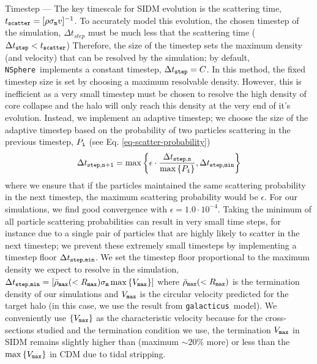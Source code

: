\documentclass[%
 reprint,
 amsmath,
 amssymb,
 aps,
]{revtex4-2}
\def\gal{{\tt galacticus}~}
\def\nsphere{{\tt NSphere}~}
\newcommand{\refeq}[1]{Eq. \ref{#1}}
\begin{document}
Timestep --- 
The key timescale for SIDM evolution is the scattering time, $t_{\tt scatter} = [\rho \sigma_{\tt m} v]^{-1}$.
To accurately model this evolution, the chosen timestep of the simulation, $\Delta t_{step}$ must be much less that the scattering time ($\Delta t_{\tt step}< t_{\tt scatter}$)
Therefore, the size of the timestep sets the maximum density (and velocity) that can be resolved by the simulation; by default, \nsphere implements a constant timestep, $\Delta t_{\tt step} = C$.
In this method, the fixed timestep size is set by choosing a maximum resolvable density. 
However, this is inefficient as a very small timestep must be chosen to resolve the high density of core collapse and the halo will only reach this density at the very end of it's evolution. 
Instead, we implement an adaptive timestep; we choose the size of the adaptive timestep based on the probability of two particles scattering in the previous timestep, $P_{\tt i}$ (see \refeq{eq-scatter-probability})
\begin{equation}
    \Delta t_{\tt step,n+1} = \max \left \{ \epsilon \cdot  \frac{\Delta t_{\tt step, n}}{\max \left \{ P_{\tt i} \right \}} , \Delta t_{\tt step, min} \right \}
\end{equation}
where we ensure that if the particles maintained the same scattering probability in the next timestep, the maximum scattering probability would be $\epsilon$.
For our simulations, we find good convergence with $\epsilon = 1.0 \cdot 10^{-4}$. 
Taking the minimum of all particle scattering probabilities can result in very small time steps, for instance due to a single pair of particles that are highly likely to scatter in the next timestep; we prevent these extremely small timesteps by implementing a timestep floor $\Delta t_{\tt step, min}$. 
We set the timestep floor proportional to the maximum density we expect to resolve in the simulation, $\Delta t_{\tt step, min} = [\bar{\rho}_{\tt max}(< R_{\tt max}) \sigma_{\tt m} \max \left \{ V_{\tt max} \right \}]$ where $\bar{\rho}_{\tt max}(< R_{\tt max})$ is the termination density of our simulations and $V_{\tt max}$ is the circular velocity predicted for the target halo (in this case, we use the result from \gal model).
We conveniently use $\left \{ V_{\tt max} \right \}$ as the characteristic velocity because for the cross-sections studied and the termination condition we use, the termination $V_{\tt max}$ in SIDM remains slightly higher than (maximum $\sim 20 \%$ more) or less than the $\max \left \{ V_{\tt max} \right \}$ in CDM due to tidal stripping. 
\end{document}
